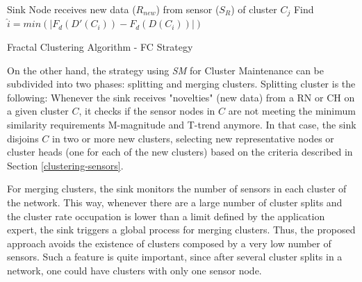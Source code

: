 \documentclass{acm_proc_article-sp}
\begin{document}
\begin{algorithm}
 \SetAlgoLined
 \LinesNumbered
 Sink Node receives new data ($R_{new}$) from sensor ($S_{R}$) of cluster $C_j$\;
  Find $\hat{i} = min(|F_d(D'(C_i)) - F_d(D(C_i))|)$\;
 
 \caption{Fractal Clustering Algorithm - FC Strategy}
 \label{alg:MDFD}
\end{algorithm}


On the other hand, the strategy using \textit{SM} for Cluster Maintenance can be
subdivided into two phases: splitting and merging clusters. Splitting cluster is
the following:
Whenever the sink receives "novelties" (new data) from a RN or CH on a given
cluster $C$, it checks if the sensor nodes in $C$ are not meeting the minimum
similarity requirements M-magnitude and T-trend anymore. In that case, the sink
disjoins $C$ in two or more new clusters, selecting new representative nodes or
cluster heads (one for each of the new clusters) based on the criteria described
in Section \ref{clustering-sensors}.

For merging clusters, the sink monitors the number of sensors in each cluster of
the network. This way, whenever there are a large number of cluster splits and
the cluster rate occupation is lower than a limit defined by the application
expert, the sink triggers a global process for merging clusters. Thus, the
proposed approach avoids the existence of clusters composed by a very low number
of sensors. Such a feature is quite important, since after several cluster
splits in a network, one could have clusters with only one sensor node.
\end{document}
